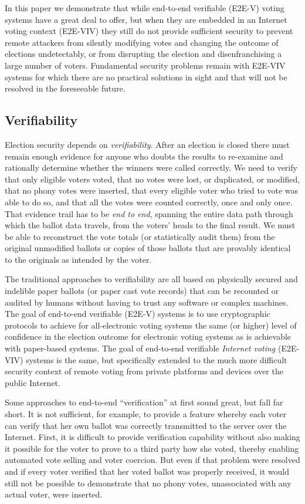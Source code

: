 In this paper we demonstrate that while end-to-end verifiable (E2E-V)
voting systems have a great deal to offer, but when they are embedded
in an Internet voting context (E2E-VIV) they still do not provide
sufficient security to prevent remote attackers from silently
modifying votes and changing the outcome of elections undetectably, or
from disrupting the election and disenfranchising a large number of
voters. Fundamental security problems remain with E2E-VIV systems for
which there are no practical solutions in sight and that will not be
resolved in the foreseeable future.

\subsection{Verifiability}

Election security depends on \emph{verifiability}. After an election
is closed there must remain enough evidence for anyone who doubts the
results to re-examine and rationally determine whether the winners
were called correctly. We need to verify that only eligible voters
voted, that no votes were lost, or duplicated, or modified, that no
phony votes were inserted, that every eligible voter who tried to vote
was able to do so, and that all the votes were counted correctly, once
and only once. That evidence trail has to be \emph{end to end},
spanning the entire data path through which the ballot data travels,
from the voters' heads to the final result. We must be able to
reconstruct the vote totals (or statistically audit them) from the
original unmodified ballots or copies of those ballots that are
provably identical to the originals as intended by the voter.

The traditional approaches to verifiability are all based on
physically secured and indelible paper ballots (or paper cast vote
records) that can be recounted or audited by humans without having to
trust any software or complex machines. The goal of end-to-end
verifiable (E2E-V) systems is to use cryptographic protocols to
achieve for all-electronic voting systems the same (or higher) level
of confidence in the election outcome for electronic voting systems as
is achievable with paper-based systems. The goal of end-to-end
verifiable \emph{Internet voting} (E2E-VIV) systems is the same, but
specifically extended to the much more difficult security context of
remote voting from private platforms and devices over the public
Internet.

Some approaches to end-to-end ``verification'' at first sound great,
but fall far short. It is not sufficient, for example, to provide a
feature whereby each voter can verify that her own ballot was
correctly transmitted to the server over the Internet. First, it is
difficult to provide verification capability without also making it
possible for the voter to prove to a third party how she voted,
thereby enabling automated vote selling and voter coercion. But even
if that problem were resolved and if every voter verified that her
voted ballot was properly received, it would still not be possible to
demonstrate that no phony votes, unassociated with any actual voter,
were inserted.

